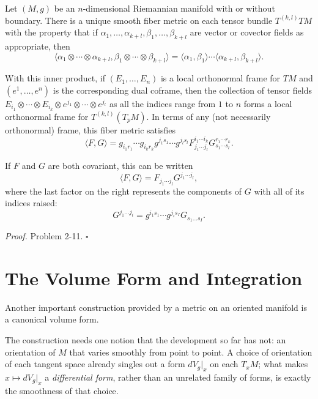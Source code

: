 \begin{proposition}
\label{prop:inner-products-of-tensors}
Let $(M, g)$ be an $n$-dimensional Riemannian manifold with or without boundary. There is a unique smooth fiber metric on each tensor bundle $T^{(k,l)}TM$ with the property that if $\alpha_1, \ldots, \alpha_{k+l}, \beta_1, \ldots, \beta_{k+l}$ are vector or covector fields as appropriate, then
\begin{equation}
\langle\alpha_1 \otimes \cdots \otimes \alpha_{k+l}, \beta_1 \otimes \cdots \otimes \beta_{k+l}\rangle = \langle\alpha_1, \beta_1\rangle \cdots \langle\alpha_{k+l}, \beta_{k+l}\rangle. \tag{2.15}
\end{equation}

With this inner product, if $(E_1, \ldots, E_n)$ is a local orthonormal frame for $TM$ and $(e^1, \ldots, e^n)$ is the corresponding dual coframe, then the collection of tensor fields $E_{i_1} \otimes \cdots \otimes E_{i_k} \otimes e^{j_1} \otimes \cdots \otimes e^{j_l}$ as all the indices range from $1$ to $n$ forms a local orthonormal frame for $T^{(k,l)}(T_pM)$. In terms of any (not necessarily orthonormal) frame, this fiber metric satisfies
\begin{equation}
\langle F, G\rangle = g_{i_1r_1} \cdots g_{i_kr_k} g^{j_1s_1} \cdots g^{j_ls_l} F_{j_1 \cdots j_l}^{i_1 \cdots i_k} G_{s_1 \cdots s_l}^{r_1 \cdots r_k}. \tag{2.16}
\end{equation}

If $F$ and $G$ are both covariant, this can be written
\[
\langle F, G\rangle = F_{j_1 \cdots j_l} G^{j_1 \cdots j_l},
\]
where the last factor on the right represents the components of $G$ with all of its
indices raised:
\[
G^{j_1 \ldots j_i} = g^{i_1 s_1} \cdots g^{j_i s_I} G_{s_1 \ldots s_I}.
\]
\end{proposition}

\textit{Proof.} Problem 2-11. $\square$

\section{The Volume Form and Integration}

Another important construction provided by a metric on an oriented manifold is a
canonical volume form.

The construction needs one notion that the development so far has not: an orientation of $M$
that varies smoothly from point to point. A choice of orientation of each tangent space
already singles out a form $dV_g|_x$ on each $T_x M$; what makes $x \mapsto dV_g|_x$ a
\emph{differential form}, rather than an unrelated family of forms, is exactly the smoothness
of that choice.

